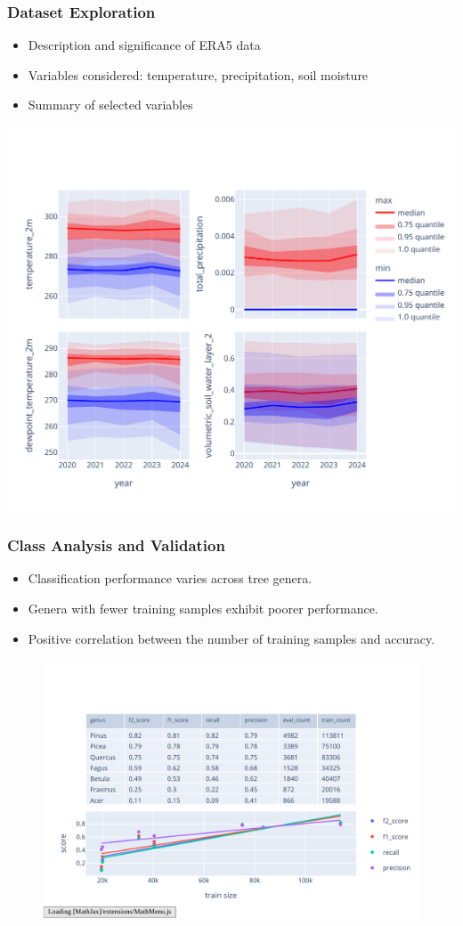\documentclass[compress]{beamer}
\begin{document}
\begin{frame}
\frametitle{Dataset Exploration}
\begin{itemize}
    \item Description and significance of ERA5 data
    \item Variables considered: temperature, precipitation, soil moisture
    \item Summary of selected variables
\end{itemize}
\includegraphics[width=0.8\linewidth]{../report/figures/figures_climate/selected_variables_stats.pdf}
\end{frame}

\begin{frame}
\frametitle{Class Analysis and Validation}

\begin{itemize}
    \item Classification performance varies across tree genera.
    \item Genera with fewer training samples exhibit poorer performance.
    \item Positive correlation between the number of training samples and accuracy.
\end{itemize}

\begin{figure}
    \centering
    \includegraphics[width=0.9\linewidth, trim={10pt 20pt 10pt 40pt}, clip]{../report/figures/figures_class/class_analysis.pdf}
\end{figure}

\end{frame}
\end{document}
